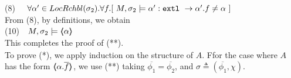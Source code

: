 \SP (8) \ \  $\forall \alpha' \in \LRelevantO {\sigma_2}.\forall f.[ \   M, \sigma_2 \models \alpha':\prg{extl}\ \rightarrow \alpha'.f  \neq \alpha\ ]$\\
From (8), by definitions, we obtain\\
 \SP (10)\ \ $M, \sigma_2 \models \langle\!\!\langle \alpha \rangle\!\!\rangle$\\
 This completes the proof of (**).
 $\strut ~ \ $\\
 To prove (*), we apply induction on the structure of $A$. Ffor the case where $A$ has the form $\langle\!\!\langle \alpha.\overline f \rangle\!\!\rangle$, we use (**) taking $\overline {\phi_1} = \overline { \phi_2}$, and $\sigma \triangleq (\overline {\phi_1},\chi).$
\\
\completeProofSub
 

\vspace{1cm}

